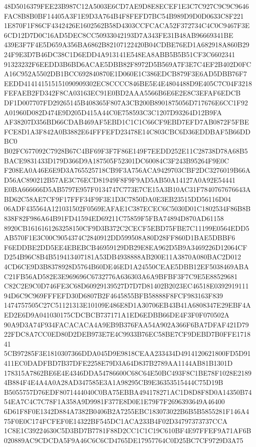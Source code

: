\documentclass[UTF8,fontset=fandol,zihao=-4,a4paper]{ctexart}
\begin{document}
{{48D5016379FEE23B987C12A5003E6CD7AE9D8E8ECEF1E3C7C927C9C9C9646FAC8B8B0BF14405A3F1E9D3A764B4F8FEFD7BC54B989D9D0D0633C8F221
1E870F1F86CF4342426E1602562B58D4303CCFCACA52F372734C4C0C9467F3E6CD12D7D0C16AD5DEC8CC50933042193D7A343FE31B48AB96669341BE
439E3F7F4E5D659A356BA6862B82107122420B04CDBE76ED1A682918A860B2924F9E3D7B46DC38C1D6EDD4A913141E548EA8ABB5B5B51CF3C6602341
91323232F6EEDD3B6BD6ACAE5DBB82F8972D5B569A7F3E7C4EF2B402D0FCA16C952A5502DB1BCC692840870E1D060E1C386EDCB879F3E6AD5DBB76F7
EEDD414141515151090909302EC8CCCC846BE5E4E4804488D9E405C7C04F3218FEFAEB2FD342F8CA03163EC91E0BD2AAA5566B6E6E2E8C3EFAF6EDCB
DF1D007707FD29265145B408365F807A3CB200B8901875056D717676E6CC1F92A01960D082D474E9D205D415A44C0E758593C3C1207D93264D12B9FA
AF38207D356BD66CDAB469AF5EBD1C1C1C66CF9EBD7EFD7AB0872F5FBEFCE8D1A3F842A0B3882E64FFFEFD23478E14C803CBC6D36EDDBAF5B66DDBC0
B02FC677092C7928B67C4BF69F3F7F86E149F7EEDD252E11C28738D78A68B5BACE9831433D179D366D9A187505F52301DC60084C3F243B95264F9E0C
F208EA0A46E6E9D3A765525718CB9F3A756ACA9429703CBF2DC3276019B66AD56AC890212B57AE3C76ECD81949F8F9F9AD5AB50A14127A0A92E54441
E0BA666666D5AB5797E957F0134747C773E7CE15A3B10AC31F7840767676643ABD62C58AE7CF9F17FFF34F9F3E1D3C7850DA0E3EB23515DD56116D04
06ADF435564A121031502F0569EAFAE1C387ECEC6C5030D01C1802534F86B8B838F82F986A64B91FD41594ED69211C75859F5FBA74894D870AD61158
8920CB1616161263258150CF9D3B372C2CECF5EBD75FBE7C11199E0564EDD5AB570F1E3C00C9054374C2840912DD599508A80D28FF860D1BAE5DBBF6
F6EDDBE2DD5EE4EBEBCB46959129DB29E8EA962D5B9A3469226D12064CFD254B96C8B4B519413407181A53DB4938888AB200E11A3870A080BAC2D012
4CD6CE9D3B8378928D5764B60DE46ED1A24550CEAE5DBB12EF5038469ABAC21FB56AD582E3E969696C6732776A636303A6A9BFBF3F7C9E5E88529681
C82C2E9C0D746FE3C68D60929139527D7D7D81402B2023EC46518E039291911194D6C9C969FFFEFD30D6807B2F4645855BFB58888F8FCF983163F839
1474757505C27C51121313E10109E486E8D1A30706EB43B41A6808347E29EBF4AED2E6D9A041030175CDCBCB737171A1ED6EDBB66DE4F3F0F070502A
90A9D3A74F934FACACACA4A9EB9B376FAA54A902A366F6BA7DFAF421D7922FDC8A7CC0ED80D2DEB973E7E4C9933B76EC58BE7CF9DEBD7B0FFE171841
5CB97285F3E1810307366DDA045D9E9818CEAA233434D4914120621800FD5D91411EC0DADFBD7B37DFE2258E79D3A64D837B2789AA1144AB81B1301D
178315A7862BE6E4E4346DDA54786600C68C64E50BC493F8C1BE78F1028E21894B884F4E4A4A0A28AD347585E3A1A98295CB9E36353515444C75D19B
B5055757D76EDF8071444040C0BA75EBBA494178271AC1D8D8F8D0A14350B7454EA7C4C7C78F1A358A9D9981F377E8D0E1E79F7F2696393649A46400
6D61F8F0E1342D884A7382B0406B2A7255EBC183073022B6B5B5855281F146A475F0E0C174FCFEF0E14322BF545DC1ACA233B4F02D34797373737CCA
1C8E1C39224630C5D3BD7B7781F88D2CC1C1C19C610BF4E97FFEF9A71AF6B020889AC9CDCDA5F9A46C6C6CD4765DE17957764C0D25BC7CF9729D3A75
}}
\end{document}
